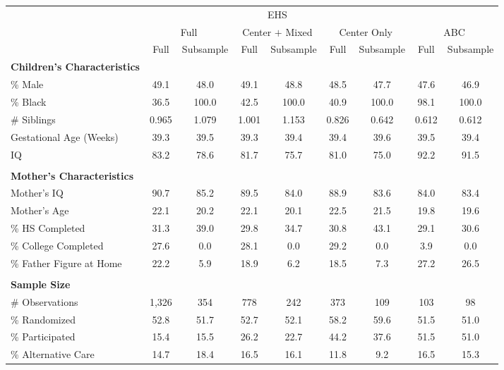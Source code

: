 \begin{tabular}{lcccccccc}
\toprule 
\midrule 
 & \multicolumn{6}{c}{EHS} & \multicolumn{2}{c}{} \\
 \cmidrule(lr){2-7} \cmidrule(lr){8-9} 
 & \multicolumn{2}{c}{Full} & \multicolumn{2}{c}{Center $+$ Mixed} & \multicolumn{2}{c}{Center Only} & \multicolumn{2}{c}{ABC} \\
 \cmidrule(lr){2-3} \cmidrule(lr){4-5} \cmidrule(lr){6-7} \cmidrule(lr){8-9} 
 & Full & Subsample & Full & Subsample & Full & Subsample & Full & Subsample \\
\midrule 
\textbf{Children's Characteristics} \\
\quad \% Male & 49.1 & 48.0 & 49.1 & 48.8 & 48.5 & 47.7 & 47.6 & 46.9 \\
\quad \% Black & 36.5 & 100.0 & 42.5 & 100.0 & 40.9 & 100.0 & 98.1 & 100.0 \\
\quad \# Siblings & 0.965 & 1.079 & 1.001 & 1.153 & 0.826 & 0.642 & 0.612 & 0.612 \\
\quad Gestational Age (Weeks) & 39.3 & 39.5 & 39.3 & 39.4 & 39.4 & 39.6 & 39.5 & 39.4 \\
\quad IQ & 83.2 & 78.6 & 81.7 & 75.7 & 81.0 & 75.0 & 92.2 & 91.5 \\
 \\
\textbf{Mother's Characteristics} \\
\quad Mother's IQ & 90.7 & 85.2 & 89.5 & 84.0 & 88.9 & 83.6 & 84.0 & 83.4 \\
\quad Mother's Age & 22.1 & 20.2 & 22.1 & 20.1 & 22.5 & 21.5 & 19.8 & 19.6 \\
\quad \% HS Completed & 31.3 & 39.0 & 29.8 & 34.7 & 30.8 & 43.1 & 29.1 & 30.6 \\
\quad \% College Completed & 27.6 & 0.0 & 28.1 & 0.0 & 29.2 & 0.0 & 3.9 & 0.0 \\
\quad \% Father Figure at Home & 22.2 & 5.9 & 18.9 & 6.2 & 18.5 & 7.3 & 27.2 & 26.5 \\
 \\
\textbf{Sample Size} \\
\quad \# Observations & 1,326 & 354 & 778 & 242 & 373 & 109 & 103 & 98 \\
\quad \% Randomized & 52.8 & 51.7 & 52.7 & 52.1 & 58.2 & 59.6 & 51.5 & 51.0 \\
\quad \% Participated & 15.4 & 15.5 & 26.2 & 22.7 & 44.2 & 37.6 & 51.5 & 51.0 \\
\quad \% Alternative Care & 14.7 & 18.4 & 16.5 & 16.1 & 11.8 & 9.2 & 16.5 & 15.3 \\
\midrule 
\bottomrule 
\end{tabular}
